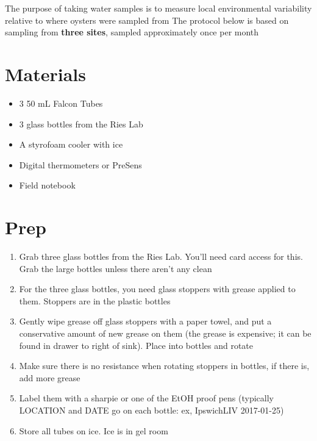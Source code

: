\documentclass[
  letterpaper,
  DIV=11,
  numbers=noendperiod]{scrreprt}
\begin{document}
The purpose of taking water samples is to measure local environmental
variability relative to where oysters were sampled from The protocol
below is based on sampling from \textbf{three sites}, sampled
approximately once per month

\hypertarget{materials-3}{%
\section*{\texorpdfstring{\textbf{Materials}}{Materials}}\label{materials-3}}


\begin{itemize}
\item
  3 50 mL Falcon Tubes
\item
  3 glass bottles from the Ries Lab
\item
  A styrofoam cooler with ice
\item
  Digital thermometers or PreSens
\item
  Field notebook
\end{itemize}

\hypertarget{prep-1}{%
\section*{\texorpdfstring{\textbf{Prep}}{Prep}}\label{prep-1}}


\begin{enumerate}
\def\labelenumi{\arabic{enumi}.}
\item
  Grab three glass bottles from the Ries Lab. You'll need card access
  for this. Grab the large bottles unless there aren't any clean
\item
  For the three glass bottles, you need glass stoppers with grease
  applied to them. Stoppers are in the plastic bottles
\item
  Gently wipe grease off glass stoppers with a paper towel, and put a
  conservative amount of new grease on them (the grease is expensive; it
  can be found in drawer to right of sink). Place into bottles and
  rotate
\item
  Make sure there is no resistance when rotating stoppers in bottles, if
  there is, add more grease
\item
  Label them with a sharpie or one of the EtOH proof pens (typically
  LOCATION and DATE go on each bottle: ex, IpswichLIV 2017-01-25)
\item
  Store all tubes on ice. Ice is in gel room
\end{enumerate}
\end{document}
